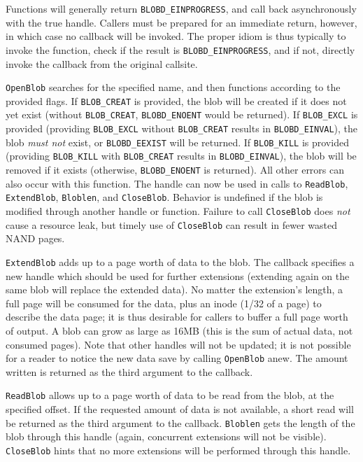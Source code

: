 \documentclass[letterpaper,10pt]{article}
\begin{document}
Functions will generally return {\texttt{BLOBD\_EINPROGRESS}}, and call back
asynchronously with the true handle. Callers must be prepared for an immediate
return, however, in which case no callback will be invoked. The proper idiom
is thus typically to invoke the function, check if the result is
{\texttt{BLOBD\_EINPROGRESS}}, and if not, directly invoke the callback
from the original callsite.

{\texttt{OpenBlob}} searches for the specified name, and then functions according
to the provided flags. If {\texttt{BLOB\_CREAT}} is provided, the blob will be
created if it does not yet exist (without \texttt{BLOB\_CREAT}, {\texttt{BLOBD\_ENOENT}} would
be returned). If {\texttt{BLOB\_EXCL}} is provided (providing {\texttt{BLOB\_EXCL}}
without {\texttt{BLOB\_CREAT}} results in {\texttt{BLOBD\_EINVAL}}), the
blob \textit{must not} exist, or \texttt{BLOBD\_EEXIST} will be returned. If
\texttt{BLOB\_KILL} is provided (providing \texttt{BLOB\_KILL} with \texttt{BLOB\_CREAT}
results in \texttt{BLOBD\_EINVAL}), the blob will be removed if it exists (otherwise,
\texttt{BLOBD\_ENOENT} is returned). All other errors can also occur with this
function. The handle can now be used in calls to \texttt{ReadBlob}, \texttt{ExtendBlob},
\texttt{Bloblen}, and \texttt{CloseBlob}. Behavior is undefined if the blob
is modified through another handle or function. Failure to call \texttt{CloseBlob}
does \textit{not} cause a resource leak, but timely use of \texttt{CloseBlob}
can result in fewer wasted NAND pages.

\texttt{ExtendBlob} adds up to a page worth of data to the blob. The callback
specifies a new handle which should be used for further extensions (extending
again on the same blob will replace the extended data). No matter the extension's
length, a full page will be consumed for the data, plus an inode (1/32 of a page)
to describe the data page; it is thus desirable for callers to buffer a full page
worth of output. A blob can grow as large as 16MB (this is the sum of actual
data, not consumed pages). Note that other handles will not be updated; it is
not possible for a reader to notice the new data save by calling \texttt{OpenBlob}
anew. The amount written is returned as the third argument to the callback.

\texttt{ReadBlob} allows up to a page worth of data to be read from the blob,
at the specified offset. If the requested amount of data is not available, a
short read will be returned as the third argument to the callback. \texttt{Bloblen}
gets the length of the blob through this handle (again, concurrent extensions
will not be visible). \texttt{CloseBlob} hints that no more extensions will
be performed through this handle.
\end{document}
